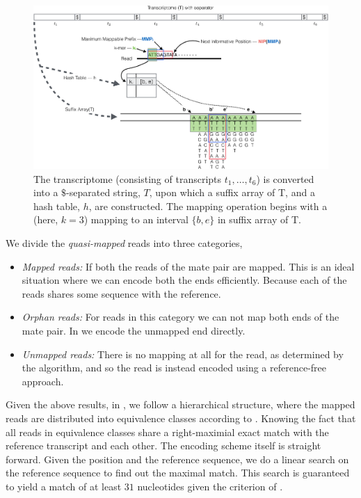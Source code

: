  
\begin{figure}[!ht]
\includegraphics[width=\textwidth]{Figures/overview_quasi}
\centering
\caption{\label{fig:overview_quasi}The transcriptome (consisting of transcripts $t_1,\ldots ,t_6$) is converted into a $\$$-separated string, $T$, upon which a suffix array of T, and a hash table, $h$, are constructed. The mapping operation begins with a \kmer (here, $k=3$) mapping to an interval $\{b,e\}$ in suffix array of T.}
\end{figure}

We divide the \textit{quasi-mapped} reads into three categories, 
\begin{itemize}
    \item {\it Mapped reads:} If both the reads of the mate pair are mapped. This is an ideal situation where we can encode both the ends efficiently. Because each of the reads shares some sequence with the reference.
    \item {\it Orphan reads:} For reads in this category we can not map both ends of the mate pair. In \quark we encode the unmapped end directly.
    \item {\it Unmapped reads:} There is no mapping at all for the read, as determined by the \qm algorithm, and so the read is instead encoded using a reference-free approach.
\end{itemize}

Given the above results, in \quark, we follow a hierarchical structure, where the mapped reads are distributed into equivalence classes according to . Knowing the fact that all reads in equivalence classes share a right-maximial exact match with the reference transcript and each other. The encoding scheme itself is straight forward. Given the position and the reference sequence, we do a linear search on the reference sequence to find out the maximal match. This search is guaranteed to yield a match of at least $31$ nucleotides given the criterion of \qm.

